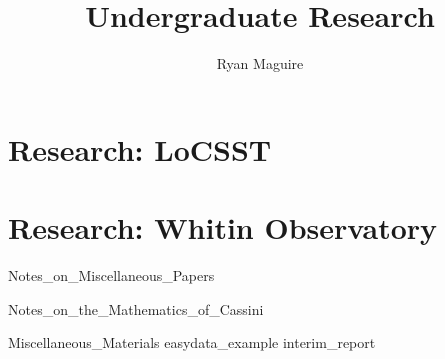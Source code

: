 \documentclass[crop=false,class=book,oneside]{standalone}
\begin{document}
    \newif\ifresearch
    \ifstandalone
        \title{Undergraduate Research}
        \author{Ryan Maguire}
        \date{\vspace{-5ex}}
        \maketitle
        \tableofcontents
        \listoffigures
        \listoftables
        \clearpage
    \fi
    \part{Research: LoCSST}
    \part{Research: Whitin Observatory}
        
                  {Notes_on_Miscellaneous_Papers}
        
                  {Notes_on_the_Mathematics_of_Cassini}
    
              {Miscellaneous_Materials}
    {easydata_example}
    {interim_report}
\end{document}

